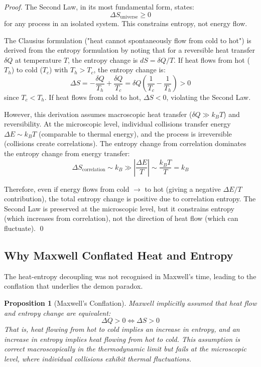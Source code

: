 \documentclass[12pt,a4paper]{article}
\newtheorem{proposition}[theorem]{Proposition}
\theoremstyle{definition}
\theoremstyle{remark}
\begin{document}
\begin{proof}
The Second Law, in its most fundamental form, states:
\begin{equation}
\Delta S_{\text{universe}} \geq 0
\end{equation}
for any process in an isolated system. This constrains entropy, not energy flow.

The Clausius formulation ("heat cannot spontaneously flow from cold to hot") is derived from the entropy formulation by noting that for a reversible heat transfer $\delta Q$ at temperature $T$, the entropy change is $dS = \delta Q / T$. If heat flows from hot ($T_h$) to cold ($T_c$) with $T_h > T_c$, the entropy change is:
\begin{equation}
\Delta S = -\frac{\delta Q}{T_h} + \frac{\delta Q}{T_c} = \delta Q \left(\frac{1}{T_c} - \frac{1}{T_h}\right) > 0
\end{equation}
since $T_c < T_h$. If heat flows from cold to hot, $\Delta S < 0$, violating the Second Law.

However, this derivation assumes macroscopic heat transfer ($\delta Q \gg k_B T$) and reversibility. At the microscopic level, individual collisions transfer energy $\Delta E \sim k_B T$ (comparable to thermal energy), and the process is irreversible (collisions create correlations). The entropy change from correlation dominates the entropy change from energy transfer:
\begin{equation}
\Delta S_{\text{correlation}} \sim k_B \gg \left|\frac{\Delta E}{T}\right| \sim \frac{k_B T}{T} = k_B
\end{equation}

Therefore, even if energy flows from cold $\to$ to hot (giving a negative $\Delta E / T$ contribution), the total entropy change is positive due to correlation entropy. The Second Law is preserved at the microscopic level, but it constrains entropy (which increases from correlation), not the direction of heat flow (which can fluctuate). \qed
\end{proof}



\subsection{Why Maxwell Conflated Heat and Entropy}

The heat-entropy decoupling was not recognised in Maxwell's time, leading to the conflation that underlies the demon paradox.

\begin{proposition}[Maxwell's Conflation]
\label{prop:maxwell_conflation}
Maxwell implicitly assumed that heat flow and entropy change are equivalent:
\begin{equation}
\Delta Q > 0 \iff \Delta S > 0
\label{eq:maxwell_conflation}
\end{equation}
That is, heat flowing from hot to cold implies an increase in entropy, and an increase in entropy implies heat flowing from hot to cold. This assumption is correct macroscopically in the thermodynamic limit but fails at the microscopic level, where individual collisions exhibit thermal fluctuations.
\end{proposition}
\end{document}
